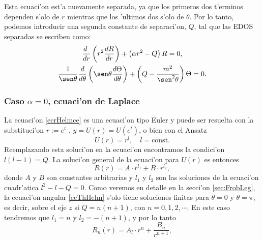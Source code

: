 Esta ecuaci'on est'a nuevamente separada, ya que los primeros dos t'erminos dependen s'olo de $r$ mientras que los 'ultimos dos s'olo de $\theta$. Por lo tanto, podemos introducir una segunda constante de separaci'on, $Q$, tal que las EDOS separadas se escriben como:
\begin{gather}
\frac{d\ }{dr}\left(r^2\frac{dR}{dr}\right)+\left(\alpha r^2-Q\right)R=0, \label{ecrHelmce}\\
\frac{1}{\sen\theta}\frac{d}{d\theta}\left(\sen\theta\frac{d\Theta}{d\theta}\right)
+\left(Q-\frac{m^2}{\sen^2\theta}\right) \Theta = 0. \label{ecThHelm}
\end{gather}

\subsubsection{Caso $\alpha=0$, ecuaci'on de Laplace}
 La ecuaci'on \eqref{ecrHelmce} es una ecuaci'on tipo Euler y puede ser resuelta con la
substituci'on $r:=e^t$ , $y=U(r)=U(e^t)$, o bien con el Ansatz
 \begin{equation}
  U(r) = r^l,\quad l=\text{const.}
\end{equation}
  Reemplazando esta soluci'on en la ecuaci'on encontramos la condici'on
 $l(l-1)=Q$. La soluci'on general de la ecuaci'on para $U(r)$ es entonces
\begin{equation}
 R(r) = A\cdot r^{l_1} + B\cdot r^{l_2},\label{loes2}
\end{equation}
donde $A$ y $B$ son constantes arbitrarias y $l_1$ y $l_2$ son las soluciones de la ecuaci'on cuadr'atica $l^2-l-Q=0$. Como veremos en detalle en la secci'on \ref{sec:FrobLeg}, la ecuaci'on angular \eqref{ecThHelm} s'olo tiene soluciones finitas para $\theta=0$ y $\theta=\pi$, es decir, sobre el eje $z$ si $Q=n(n+1)$, con $n=0,1,2,\cdots$. En este caso tendremos que $l_1=n$ y $l_2=-(n+1)$, y por lo tanto
\begin{equation}
R_n(r) = A_l\cdot r^n + \frac{B_n}{r^{n+1}},\label{Rn}
\end{equation}
